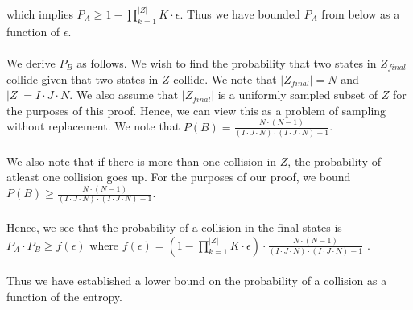 \documentclass[letterpaper,twocolumn,10pt]{article}
\begin{document}
\\
which implies $P_{A} \geq 1 - \prod_{k=1}^{|Z|} K \cdot \epsilon$. Thus we have bounded $P_{A}$ from below as a function of $\epsilon$. 
\\
\\
We derive $P_{B}$ as follows. We wish to find the probability that two states in $Z_{final}$ collide given that two states in $Z$ collide. We note that $|Z_{final}| = N$ and $|Z| = I \cdot J \cdot N$. We also assume that $|Z_{final}|$ is a uniformly sampled subset of $Z$ for the purposes of this proof. Hence, we can view this as a problem of sampling without replacement. We note that $P(B) = \frac{N \cdot (N-1)}{(I \cdot J \cdot N) \cdot (I \cdot J \cdot N) -1}$. 
\\
\\
We also note that if there is more than one collision in $Z$, the probability of atleast one collision goes up. For the purposes of our proof, we bound $P(B) \geq \frac{N \cdot (N-1)}{(I \cdot J \cdot N) \cdot (I \cdot J \cdot N) -1}$.
\\
\\
Hence, we see that the probability of a collision in the final states is $P_{A} \cdot P_{B} \geq f(\epsilon)$ where $f(\epsilon) = (1 - \prod_{k=1}^{|Z|} K \cdot \epsilon) \cdot \frac{N \cdot (N-1)}{(I \cdot J \cdot N) \cdot (I \cdot J \cdot N) -1}$ . 
\\
\\
Thus we have established a lower bound on the probability of a collision as a function of the entropy.
\end{document}
